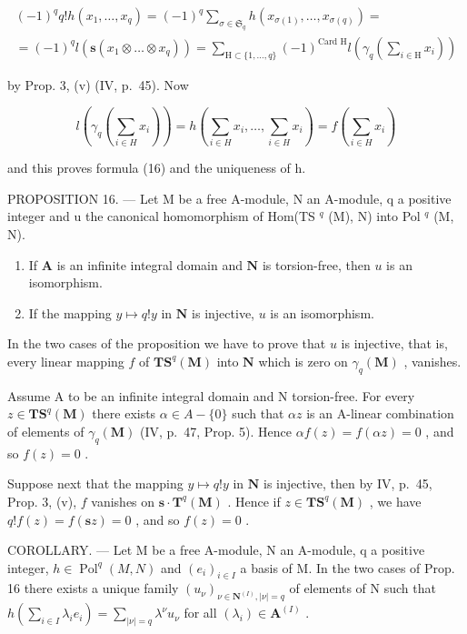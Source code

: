 \[
\begin{array}{l} (- 1) ^ {q} q! h (x _ {1}, \dots , x _ {q}) = (- 1) ^ {q} \sum_ {\sigma \in \mathfrak {S} _ {q}} h (x _ {\sigma (1)}, \dots , x _ {\sigma (q)}) = \\ = (- 1) ^ {q} l (\mathbf {s} (x _ {1} \otimes \dots \otimes x _ {q})) = \sum_ {\mathrm{H} \subset \{1, \dots , q \}} (- 1) ^ {\text {Card H}} l \left(\gamma_ {q} \left(\sum_ {i \in \mathrm{H}} x _ {i}\right)\right) \end{array}
\]

by Prop. 3, (v) (IV, p.~45). Now

\[
l \left(\gamma_ {q} \left(\sum_ {i \in H} x _ {i}\right)\right) = h \left(\sum_ {i \in H} x _ {i}, \dots , \sum_ {i \in H} x _ {i}\right) = f \left(\sum_ {i \in H} x _ {i}\right)
\]

and this proves formula (16) and the uniqueness of h.

PROPOSITION 16. --- Let M be a free A-module, N an A-module, q a positive integer and u the canonical homomorphism of Hom(TS \(^{q}\) (M), N) into Pol \(^{q}\) (M, N).

\begin{enumerate}
\def\labelenumi{(\roman{enumi})}
\item
  If \(\mathbf{A}\) is an infinite integral domain and \(\mathbf{N}\) is torsion-free, then \(u\) is an isomorphism.
\item
  If the mapping \(y \mapsto q!y\) in \(\mathbf{N}\) is injective, \(u\) is an isomorphism.
\end{enumerate}

In the two cases of the proposition we have to prove that \(u\) is injective, that is, every linear mapping \(f\) of \(\mathbf{TS}^q(\mathbf{M})\) into \(\mathbf{N}\) which is zero on \(\gamma_q(\mathbf{M})\) , vanishes.

Assume A to be an infinite integral domain and N torsion-free. For every \(z \in \mathbf{TS}^{q}(\mathbf{M})\) there exists \(\alpha \in A - \{0\}\) such that \(\alpha z\) is an A-linear combination of elements of \(\gamma_{q}(\mathbf{M})\) (IV, p.~47, Prop. 5). Hence \(\alpha f(z) = f(\alpha z) = 0\) , and so \(f(z) = 0\) .

Suppose next that the mapping \(y \mapsto q!y\) in \(\mathbf{N}\) is injective, then by IV, p.~45, Prop. 3, (v), \(f\) vanishes on \(\mathbf{s} \cdot \mathbf{T}^q(\mathbf{M})\) . Hence if \(z \in \mathbf{T}\mathbf{S}^q(\mathbf{M})\) , we have \(q!f(z) = f(\mathbf{s}z) = 0\) , and so \(f(z) = 0\) .

COROLLARY. --- Let M be a free A-module, N an A-module, q a positive integer, \(h \in \operatorname{Pol}^{q}(M, N)\) and \((e_{i})_{i \in I}\) a basis of M. In the two cases of Prop. 16 there exists a unique family \((u_{\nu})_{\nu \in \mathbf{N}^{(I)}, |\nu| = q}\) of elements of N such that \(h\left(\sum_{i \in I} \lambda_{i} e_{i}\right) = \sum_{|\nu| = q} \lambda^{\nu} u_{\nu}\) for all \((\lambda_{i}) \in \mathbf{A}^{(I)}\) .

